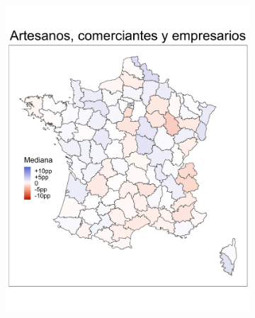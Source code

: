 \begin{figure}
\begin{subfigure}{0.235\textwidth}
	\includegraphics[width = \textwidth]{Figs/Efectos/Mapa_Efectos_CSP2_Modelo_H}
	\end{subfigure}
	~
	\begin{subfigure}{0.235\textwidth}

\end{subfigure}
\end{figure}

